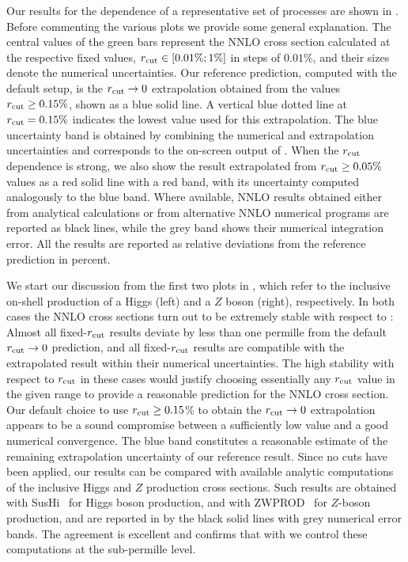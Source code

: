 \documentclass[english,11pt]{article}
\begin{document}
Our results for the \rcut{} dependence of a representative set of processes are shown in .
Before commenting the various plots we provide some general explanation.
The central values of the green bars represent the NNLO cross section calculated at the respective fixed \rcut{} 
values, $r_{\mathrm{cut}}{}\in[0.01\%;1\%]$ in steps of $0.01\%$, and their sizes denote the numerical uncertainties. 
Our reference prediction, computed with the default \Matrix{} setup, is the $r_{\mathrm{cut}}{}\rightarrow0$ extrapolation
obtained from the values $r_{\mathrm{cut}}{}\ge0.15\%$, shown as a blue solid line.
A vertical blue dotted line at $r_{\mathrm{cut}}{}=0.15\%$ indicates the lowest value used for this extrapolation. 
The blue uncertainty band is obtained by combining the numerical and extrapolation uncertainties and corresponds to the
on-screen output of \Matrix{}.
When the $r_{\mathrm{cut}}$ dependence is strong, we also show the \Matrix{} result extrapolated from 
$r_{\mathrm{cut}}{}\ge0.05\%$ values as a red solid line with a red band, with its uncertainty computed analogously to the blue band.
Where available, NNLO results obtained either from analytical calculations or from
alternative NNLO numerical programs are reported as black lines, while the grey band shows their numerical
integration error.
All the results are reported as relative deviations from the reference prediction in percent. 

We start our discussion from the first two plots in ,
which refer to the inclusive on-shell production of a Higgs (left) and a $Z$ boson (right), respectively.
In both cases the NNLO cross sections turn out to be extremely stable with respect to \rcut{}:
Almost all fixed-$r_{\mathrm{cut}}$ results deviate by less than one permille from the default $r_{\mathrm{cut}}{}\rightarrow 0$ 
prediction, and all fixed-$r_{\mathrm{cut}}$ results are compatible with the extrapolated result 
within their numerical uncertainties.
The high stability with respect to $r_{\mathrm{cut}}$ in these cases would justify choosing essentially 
any $r_{\mathrm{cut}}{}$ value in the given range to provide a reasonable prediction for the NNLO cross section.
Our default choice to use $r_{\mathrm{cut}}{}\ge0.15$\% to obtain the $r_{\mathrm{cut}}\rightarrow 0$ extrapolation appears 
to be a sound compromise between a sufficiently low \rcut{} value and a good numerical convergence. 
The blue band constitutes a reasonable estimate of the remaining extrapolation 
uncertainty of our reference result. Since no cuts have been applied,
our results can be compared with available
analytic computations of the inclusive Higgs and $Z$ production cross sections.
Such results are obtained with
{\sc SusHi}~\cite{Harlander:2012pb} for Higgs boson production, and with {\sc ZWPROD}~\cite{Hamberg:1990np,Harlander:2002wh}
for $Z$-boson production, and are reported in  by the black 
solid lines with grey numerical error bands. The agreement is excellent and confirms that with \Matrix{}
we control these computations at the sub-permille level.
\end{document}
